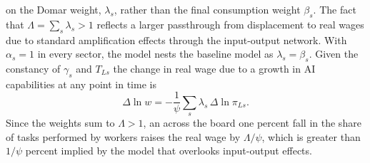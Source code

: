 \documentclass[11pt]{article}
\begin{document}
on the Domar weight, $\lambda_{s}$, rather than the final consumption
weight $\beta_{s}$. The fact that $\Lambda=\sum_{s}\lambda_{s}>1$
reflects a larger passthrough from displacement to real wages due
to standard amplification effects through the input-output network.
With $\alpha_{s}=1$ in every sector, the model nests the baseline
model as $\lambda_{s}=\beta_{s}$. Given the constancy of $\gamma_{s}$
and $T_{Ls}$ the change in real wage due to a growth in AI capabilities
at any point in time is
\begin{equation}
\Delta\ln w=-\frac{1}{\psi}\sum_{s}\lambda_{s}\,\Delta\ln\pi_{Ls}.\label{eq:io-real-wage-change}
\end{equation}
Since the weights sum to $\Lambda>1$, an across the board one percent
fall in the share of tasks performed by workers raises the real wage
by $\Lambda/\psi$, which is greater than $1/\psi$ percent implied
by the model that overlooks input-output effects.
\end{document}
